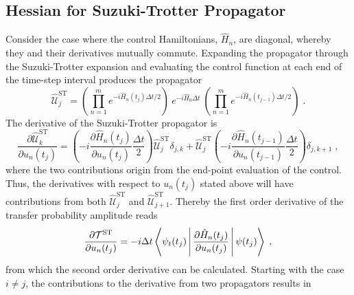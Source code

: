 \subsection*{Hessian for Suzuki-Trotter Propagator}
Consider the case where the control Hamiltonians, $\hat{H}_n$, are diagonal, whereby they and their derivatives mutually commute. Expanding the propagator through the Suzuki-Trotter expansion and evaluating the control function at each end of the time-step interval produces the propagator 
\begin{equation}
	\hat{\mathcal{U}}_{j}^{\mathrm{ST}} = \left( \prod_{n = 1}^{m} e^{ -i \hat{H}_n (t_j) \Delta t /2 } \right) \: e^{ -i \hat{H}_0 \Delta t } \: \left( \prod_{n = 1}^{m} e^{  -i  \hat{H}_n  (t_{j-1})  \Delta t /2 } \right) \; .
\end{equation}
The derivative of the Suzuki-Trotter propagator is
\begin{equation}
	\frac{\partial \hat{\mathcal{U}}_{k}^{\mathrm{ST}}}{\partial u_n (t_j)} = \left( -i \frac{\partial \hat{H}_n (t_j)}{\partial u_n (t_j)} \frac{\Delta t}{2} \right) \hat{\mathcal{U}}_{j}^{\mathrm{ST}} \delta_{j , k} + \hat{\mathcal{U}}_{j}^{\mathrm{ST}} \left( -i \frac{\partial \hat{H}_n (t_{j-1})}{\partial u_n (t_{j-1})} \frac{\Delta t}{2} \right)  \delta_{j , k+1} \; ,
\end{equation}
where the two contributions origin from the end-point evaluation of the control. Thus, the derivatives with respect to $u_n (t_j)$ stated above will have contributions from both $\hat{\mathcal{U}}_{j}^{\mathrm{ST}}$ and $\hat{\mathcal{U}}_{j+1}^{\mathrm{ST}}$. Thereby the first order derivative of the transfer probability amplitude reads 
\begin{equation}
	\frac{\partial \mathcal{T}^{\mathrm{ST}}}{\partial u_n (t_j)} = -i \Delta t \Braket{\psi_t (t_j) | \frac{\partial \hat{H}_n (t_j)}{\partial u_n (t_j)} | \psi (t_j) } \; ,
\end{equation}
from which the second order derivative can be calculated. Starting with the case $i \neq j$, the contributions to the derivative from two propagators results in
